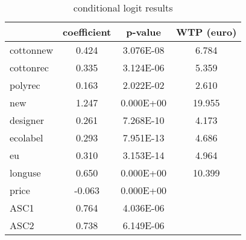 \begin{table}[ht]
\centering
\begin{tabular}{lccc}
  \hline
 & coefficient & p-value & WTP (euro) \\ 
  \hline
cottonnew & 0.424 & 3.076E-08 & 6.784 \\ 
  cottonrec & 0.335 & 3.124E-06 & 5.359 \\ 
  polyrec & 0.163 & 2.022E-02 & 2.610 \\ 
  new & 1.247 & 0.000E+00 & 19.955 \\ 
  designer & 0.261 & 7.268E-10 & 4.173 \\ 
  ecolabel & 0.293 & 7.951E-13 & 4.686 \\ 
  eu & 0.310 & 3.153E-14 & 4.964 \\ 
  longuse & 0.650 & 0.000E+00 & 10.399 \\ 
  price & -0.063 & 0.000E+00 &  \\ 
  ASC1 & 0.764 & 4.036E-06 &  \\ 
  ASC2 & 0.738 & 6.149E-06 &  \\ 
   \hline
\end{tabular}
\caption{conditional logit results} 
\label{tab:ConditionalLogitModelsummary}
\end{table}

